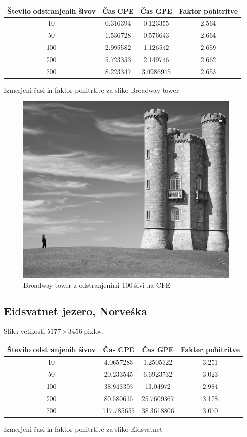 \documentclass[11pt,a4paper]{article}
\begin{document}
\begin{center}
  \begin{tabular}{ c | c | c | c }
    Število odstranjenih šivov & Čas CPE & Čas GPE & Faktor pohitritve \\
    \hline
    10 & 0.316394 & 0.123355 & 2.564 \\
    50 & 1.536728 & 0.576643 & 2.664 \\
    100 & 2.995582 & 1.126542 & 2.659 \\
    200 & 5.723353 & 2.149746 & 2.662 \\
    300 & 8.223347 & 3.0986945 & 2.653 \\
    \hline
  \end{tabular}
  \caption{Izmerjeni časi in faktor pohitrtive za sliko Broadway tower}
  \label{tab:performance_tower}
\end{center}

\begin{figure}[htbp]
\begin{center}
\includegraphics[width=0.7\columnwidth]{tower_100.png}
\end{center}
\caption{Broadway tower z odstranjenimi 100 šivi na CPE}
\label{fig:tower_seam}
\end{figure}

\pagebreak

\subsection{Eidsvatnet jezero, Norveška}

Slika velikosti $5177 \times 3456$ pixlov.

\begin{center}
  \begin{tabular}{ c | c | c | c }
    Število odstranjenih šivov & Čas CPE & Čas GPE & Faktor pohitritve \\
    \hline
    10 & 4.0657288 & 1.2505322 & 3.251 \\
    50 & 20.233545 & 6.6923732 & 3.023 \\
    100 & 38.943393 & 13.04972 & 2.984 \\
    200 & 80.580615 & 25.7609367 & 3.128 \\
    300 & 117.785656 & 38.3618806 & 3.070 \\
    \hline
  \end{tabular}
  \caption{Izmerjeni časi in faktor pohitrtive za sliko Eidsvatnet}
  \label{tab:performance_eidsvatnet}
\end{center}
\end{document}
